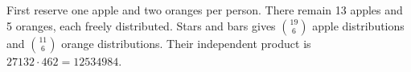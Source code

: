 First reserve one apple and two oranges per person. There remain 13 apples and 5 oranges, each freely distributed. Stars and bars gives $\binom{19}6$ apple distributions and $\binom{11}6$ orange distributions. Their independent product is $27132\cdot 462=\boxed{12534984}$.
